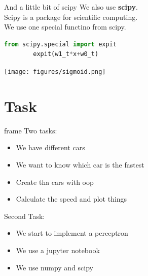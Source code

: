 \documentclass{beamer}
\begin{document}
\begin{frame}[fragile]{And a little bit of scipy}
    We also use \textbf{scipy}.\\
    Scipy is a package for scientific computing.\\\pause
    We use one special functino from scipy.\\\pause
    \begin{lstlisting}[language=Python, backgroundcolor = \color{lightgray}]
        from scipy.special import expit
        expit(w1_t*x+w0_t)
    \end{lstlisting}
    \begin{center}
        \texttt{[image: figures/sigmoid.png]}
    \end{center}
\end{frame}
    

\section{Task}

\begin{frame}{frame}
    Two tasks:\pause
    \begin{itemize}
        \item We have different cars
        \item We want to know which car is the fastest
        \item Create tha cars with oop
        \item Calculate the speed and plot things
    \end{itemize}
    Second Task:
    \begin{itemize}
        \item We start to implement a perceptron
        \item We use a jupyter notebook
        \item We use numpy and scipy
    \end{itemize}
\end{frame}
\end{document}
